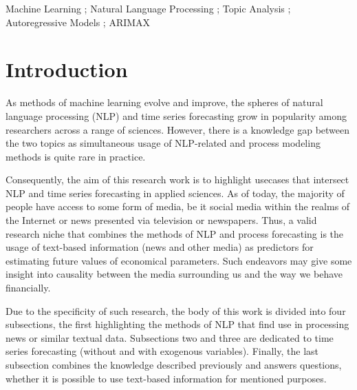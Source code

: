 \documentclass[3p,times,procedia]{elsarticle}
\begin{document}
\begin{frontmatter}
\begin{keyword}
Machine Learning ; Natural Language Processing ; Topic Analysis ; Autoregressive Models ; ARIMAX




\end{keyword}
\end{frontmatter}




\section{Introduction}

As methods of machine learning evolve and improve, the spheres of natural language processing (NLP) and time series forecasting grow in popularity among researchers across a range of sciences. However, there is a knowledge gap between the two topics as simultaneous usage of NLP-related and process modeling methods is quite rare in practice.

Consequently, the aim of this research work is to highlight usecases that intersect NLP and time series forecasting in applied sciences. As of today, the majority of people have access to some form of media, be it social media within the realms of the Internet or news presented via television or newspapers. Thus, a valid research niche that combines the methods of NLP and process forecasting is the usage of text-based information (news and other media) as predictors for estimating future values of economical parameters. Such endeavors may give some insight into causality between the media surrounding us and the way we behave financially.

Due to the specificity of such research, the body of this work is divided into four subsections, the first highlighting the methods of NLP that find use in processing news or similar textual data. Subsections two and three are dedicated to time series forecasting (without and with exogenous variables). Finally, the last subsection combines the knowledge described previously and answers questions, whether it is possible to use text-based information for mentioned purposes.
\end{document}
